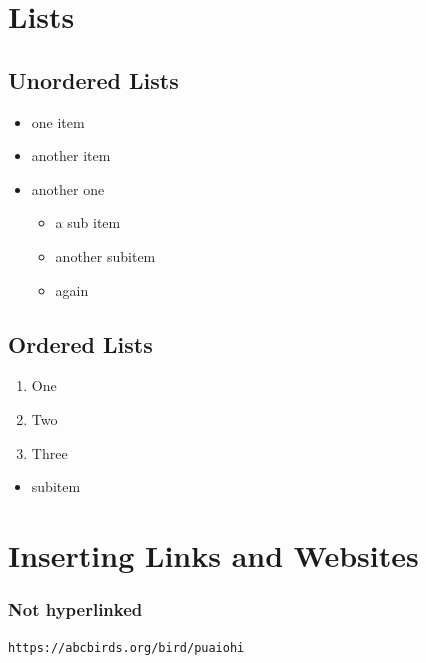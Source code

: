 \documentclass[
]{article}
\providecommand{\tightlist}{%
  \setlength{\itemsep}{0pt}\setlength{\parskip}{0pt}}
\begin{document}
\section{Lists}\label{lists}

\subsection{Unordered Lists}\label{unordered-lists}

\begin{itemize}
\tightlist
\item
  one item
\item
  another item
\item
  another one

  \begin{itemize}
  \tightlist
  \item
    a sub item
  \item
    another subitem
  \item
    again
  \end{itemize}
\end{itemize}

\subsection{Ordered Lists}\label{ordered-lists}

\begin{enumerate}
\def\labelenumi{\arabic{enumi}.}
\tightlist
\item
  One
\item
  Two
\item
  Three
\end{enumerate}

\begin{itemize}
\tightlist
\item
  subitem
\end{itemize}

\section{Inserting Links and
Websites}\label{inserting-links-and-websites}

\subsubsection{Not hyperlinked}\label{not-hyperlinked}

\texttt{https://abcbirds.org/bird/puaiohi}
\end{document}
